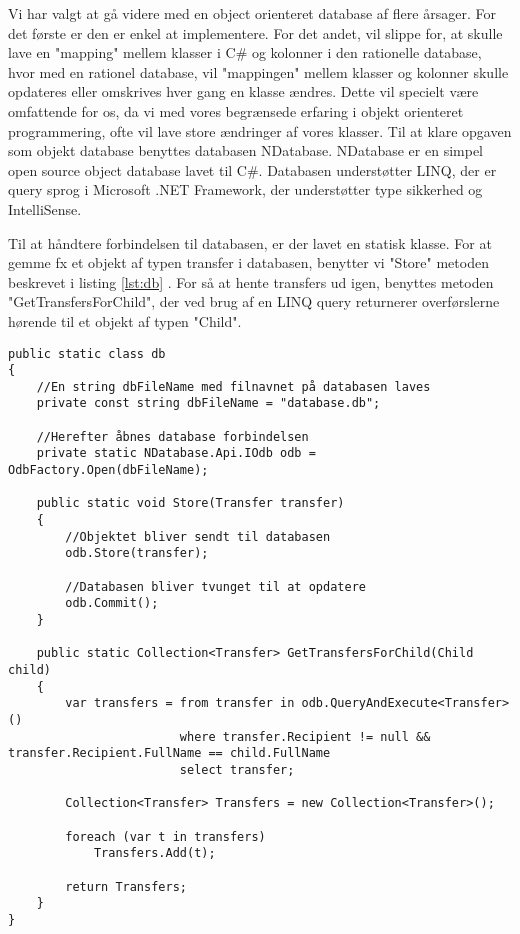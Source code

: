 Vi har valgt at gå videre med en object orienteret database af flere årsager. For det første er den er enkel at implementere. For det andet, vil slippe for, at skulle lave en "mapping" mellem klasser i C\# og kolonner i den rationelle database, hvor med en rationel database, vil "mappingen" mellem klasser og kolonner skulle opdateres eller omskrives hver gang en klasse ændres. Dette vil specielt være omfattende for os, da vi med vores begrænsede erfaring i objekt orienteret programmering, ofte vil lave store ændringer af vores klasser.
Til at klare opgaven som objekt database benyttes databasen NDatabase. NDatabase er en simpel open source object database lavet til C\#. Databasen understøtter LINQ, der er query sprog i Microsoft .NET Framework, der understøtter type sikkerhed og IntelliSense\cite{linqdok}.

Til at håndtere forbindelsen til databasen, er der lavet en statisk klasse. For at gemme fx et objekt af typen transfer i databasen, benytter vi "Store" metoden beskrevet i listing \ref{lst:db} . For så at hente transfers ud igen, benyttes metoden "GetTransfersForChild", der ved brug af en LINQ query returnerer overførslerne hørende til et objekt af typen "Child".
\\

\begin{lstlisting}[caption={Uddrag af filen "db.cs" fra kildekoden til programmet},label={lst:db}]
public static class db
{
	//En string dbFileName med filnavnet på databasen laves
	private const string dbFileName = "database.db";
	
	//Herefter åbnes database forbindelsen
	private static NDatabase.Api.IOdb odb = OdbFactory.Open(dbFileName);

	public static void Store(Transfer transfer)
	{
		//Objektet bliver sendt til databasen
		odb.Store(transfer);
		
		//Databasen bliver tvunget til at opdatere
		odb.Commit();
	}
	
	public static Collection<Transfer> GetTransfersForChild(Child child)
	{
		var transfers = from transfer in odb.QueryAndExecute<Transfer>()
						where transfer.Recipient != null && transfer.Recipient.FullName == child.FullName
						select transfer;

		Collection<Transfer> Transfers = new Collection<Transfer>();

		foreach (var t in transfers)
			Transfers.Add(t);

		return Transfers;
	}
}
\end{lstlisting}
